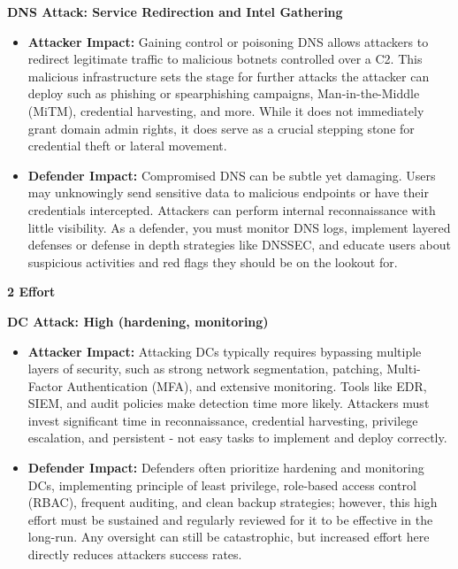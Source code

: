 \textbf{DNS Attack: Service Redirection and Intel Gathering}

\begin{itemize}
    \item \textbf{\textbf{Attacker Impact:}}
Gaining control or poisoning DNS allows attackers to redirect legitimate traffic to malicious botnets controlled over a C2. This malicious infrastructure sets the stage for further attacks the attacker can deploy such as phishing or spearphishing campaigns, Man-in-the-Middle (MiTM), credential harvesting, and more. While it does not immediately grant domain admin rights, it does serve as a crucial stepping stone for credential theft or lateral movement.

    \item \textbf{\textbf{Defender Impact:}}
Compromised DNS can be subtle yet damaging. Users may unknowingly send sensitive data to malicious endpoints or have their credentials intercepted. Attackers can perform internal reconnaissance with little visibility. As a defender, you must monitor DNS logs, implement layered defenses or defense in depth strategies like DNSSEC, and educate users about suspicious activities and red flags they should be on the lookout for.

\end{itemize}

\textbf{2 Effort}

\textbf{DC Attack: High (hardening, monitoring)}

\begin{itemize}
    \item \textbf{\textbf{Attacker Impact:}}
Attacking DCs typically requires bypassing multiple layers of security, such as strong network segmentation, patching, Multi-Factor Authentication (MFA), and extensive monitoring. Tools like EDR, SIEM, and audit policies make detection time more likely. Attackers must invest significant time in reconnaissance, credential harvesting, privilege escalation, and persistent - not easy tasks to implement and deploy correctly.

    \item \textbf{\textbf{Defender Impact:}}
Defenders often prioritize hardening and monitoring DCs, implementing principle of least privilege, role-based access control (RBAC), frequent auditing, and clean backup strategies; however, this high effort must be sustained and regularly reviewed for it to be effective in the long-run. Any oversight can still be catastrophic, but increased effort here directly reduces attackers success rates.

\end{itemize}


